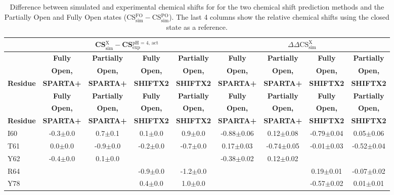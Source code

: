 \documentclass[%
 aip,
 amsmath,amssymb,
 preprint,%
]{revtex4-1}
\newcommand{\cb}{\ce{C_\beta} }
\begin{document}
\begingroup
\begin{center}
\begin{longtable}{l|c|c|c|c|c|c|c|c}
\caption{\scriptsize Difference between simulated and experimental chemical shifts for \cb for the two chemical shift prediction methods and the Partially Open and Fully Open states (CS$_\text{sim}^\text{FO}-$CS$_\text{sim}^\text{PO}$). The last 4 columns show the relative chemical shifts using the closed state as a reference.  \label{SI_tb_DDCS_CB}}\\ 
\hline 
\hline 
& \multicolumn{4}{c|}{ CS$_\text{sim}^\text{X}-$CS$_\text{exp}^\text{pH = 4, act}$} & \multicolumn{4}{c}{ $\Delta\Delta\text{CS}_\text{sim}^\text{X}$} \\
\hline
& \textbf{Fully} & \textbf{Partially} & \textbf{Fully} & \textbf{Partially} & \textbf{Fully} & \textbf{Partially} & \textbf{Fully} & \textbf{Partially} \\
& \textbf{Open,} & \textbf{Open,} & \textbf{Open,} & \textbf{Open,} & \textbf{Open,} & \textbf{Open,} & \textbf{Open,} & \textbf{Open,} \\
\textbf{Residue} & \textbf{SPARTA+} & \textbf{SPARTA+} & \textbf{SHIFTX2} & \textbf{SHIFTX2} & \textbf{SPARTA+} & \textbf{SPARTA+} & \textbf{SHIFTX2} & \textbf{SHIFTX2} \\
\hline
\endfirsthead 
\hline
& \textbf{Fully} & \textbf{Partially} & \textbf{Fully} & \textbf{Partially} & \textbf{Fully} & \textbf{Partially} & \textbf{Fully} & \textbf{Partially} \\
& \textbf{Open,} & \textbf{Open,} & \textbf{Open,} & \textbf{Open,} & \textbf{Open,} & \textbf{Open,} & \textbf{Open,} & \textbf{Open,} \\
\textbf{Residue} & \textbf{SPARTA+} & \textbf{SPARTA+} & \textbf{SHIFTX2} & \textbf{SHIFTX2} & \textbf{SPARTA+} & \textbf{SPARTA+} & \textbf{SHIFTX2} & \textbf{SHIFTX2} \\ \hline
\endhead
I60 & -0.3$\pm$0.0 & 0.7$\pm$0.1 & 0.1$\pm$0.0 & 0.9$\pm$0.0 & -0.88$\pm$0.06 & 0.12$\pm$0.08 & -0.79$\pm$0.04 & 0.05$\pm$0.06 \\
T61 & 0.0$\pm$0.0 & -0.9$\pm$0.0 & -0.2$\pm$0.0 & -0.7$\pm$0.0 & 0.17$\pm$0.03 & -0.74$\pm$0.05 & -0.01$\pm$0.03 & -0.52$\pm$0.04 \\
Y62 & -0.4$\pm$0.0 & 0.1$\pm$0.0 & & & -0.38$\pm$0.02 & 0.12$\pm$0.02 & & \\
R64 & & & -0.9$\pm$0.0 & -1.2$\pm$0.0 & & & 0.19$\pm$0.01 & -0.07$\pm$0.02 \\
Y78 & & & 0.4$\pm$0.0 & 1.0$\pm$0.0 & & & -0.57$\pm$0.02 & 0.01$\pm$0.01 \\

\end{longtable}
\end{center}
\end{document}
